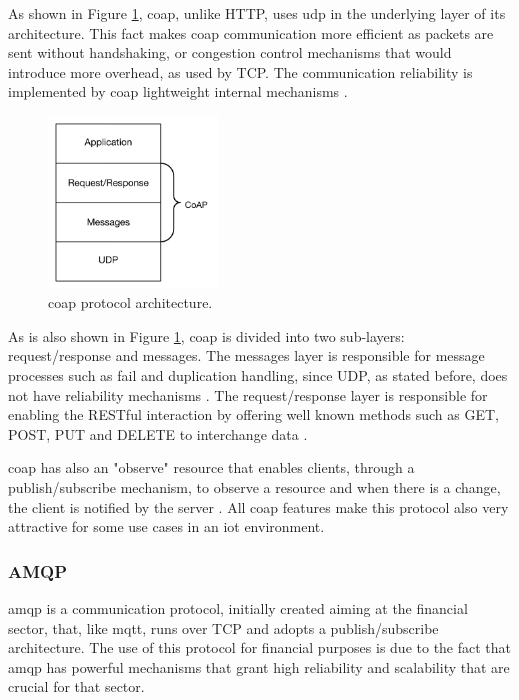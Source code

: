 As shown in Figure \ref{fig:coap}, \ac{coap}, unlike HTTP, uses \ac{udp} in the underlying layer of its architecture. This fact makes \ac{coap} communication more efficient as packets are sent without handshaking, or congestion control mechanisms that would introduce more overhead, as used by TCP. The communication reliability is implemented by \ac{coap} lightweight internal mechanisms \cite{Salman2013}.

\begin{figure}[H]
	\centering
	\includegraphics[width=0.4\textwidth]{figures/coap.png}
	\caption{\ac{coap} protocol architecture.}
	\label{fig:coap}
\end{figure}

As is also shown in Figure \ref{fig:coap}, \ac{coap} is divided into two sub-layers: request/response and messages. The messages layer is responsible for message processes such as fail and duplication handling, since UDP, as stated before, does not have reliability mechanisms \cite{Salman2013}. The request/response layer is responsible for enabling the RESTful interaction by offering well known methods such as GET, POST, PUT and DELETE to interchange data \cite{Lerche2012}.

\ac{coap} has also an "observe" resource that enables clients, through a publish/subscribe mechanism, to observe a resource and when there is a change, the client is notified by the server \cite{Lerche2012}. All \ac{coap} features make this protocol also very attractive for some use cases in an \ac{iot} environment.


\subsubsection{AMQP}

\acf{amqp} is a communication protocol, initially created aiming at the financial sector, that, like \ac{mqtt}, runs over TCP and adopts a publish/subscribe architecture. The use of this protocol for financial purposes is due to the fact that \ac{amqp} has powerful mechanisms that grant high reliability and scalability that are crucial for that sector.

